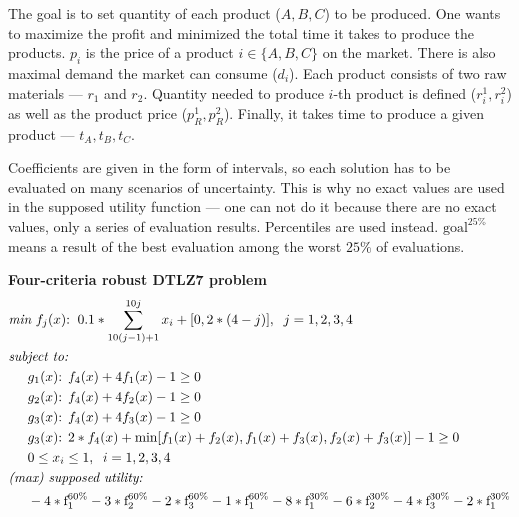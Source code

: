 \begin{description}
    The goal is to set quantity of each product ($A, B, C$) to be
    produced. One wants to maximize the profit and minimized the total time it
    takes to produce the products. $p_i$ is the price of a product $i \in \{A,
    B, C\}$ on the market. There is also maximal demand the market can consume
    ($d_i$). Each product consists of two raw materials --- $r_1$ and
    $r_2$. Quantity needed to produce $i$-th product is defined ($r^1_i,
    r^2_i$) as well as the product price ($p^1_R, p^2_R$). Finally, it takes
    time to produce a given product --- $t_A, t_B, t_C$.

    Coefficients are given in the form of intervals, so each solution has to
    be evaluated on many scenarios of uncertainty. This is why no exact values
    are used in the supposed utility function --- one can not do it because
    there are no exact values, only a series of evaluation
    results. Percentiles are used instead. $\text{goal}^{25\%}$ means a result
    of the best evaluation among the worst $25\%$ of evaluations.

  \item{\textbf{Four-criteria robust DTLZ7 problem}}
    \begin{align*}
      & \textit{min}\text{ $f_j(x)$:} \hspace{0.2cm}
      0.1 * \sum_{10(j-1) + 1}^{10j}x_i + [0, 2*(4-j)], \hspace{0.2cm}
      j = 1, 2, 3, 4\\
      & \textit{subject to:} \\
      & \hspace{0.5cm} g_1(x)\text{: } f_4(x) + 4f_1(x) - 1 \ge 0\\
      & \hspace{0.5cm} g_2(x)\text{: } f_4(x) + 4f_2(x) - 1 \ge 0\\
      & \hspace{0.5cm} g_3(x)\text{: } f_4(x) + 4f_3(x) - 1 \ge 0\\
      & \hspace{0.5cm} g_3(x)\text{: } 2*f_4(x) + \text{min}
      [f_1(x) + f_2(x), f_1(x) + f_3(x), f_2(x) + f_3(x)] -1 \ge 0\\
      & \hspace{0.5cm} 0 \le x_i \le 1, \hspace{0.2cm} i = 1, 2, 3, 4 \\
      & \textit{(max) supposed utility:} \\
      & \hspace{0.5cm} -4 * \text{f}_1^{60\%} -3 * \text{f}_2^{60\%}
      -2 * \text{f}_3^{60\%} -1 * \text{f}_1^{60\%}
      -8 * \text{f}_1^{30\%} -6 * \text{f}_2^{30\%}
      -4 * \text{f}_3^{30\%} -2 * \text{f}_1^{30\%}
    \end{align*}


\end{description}
